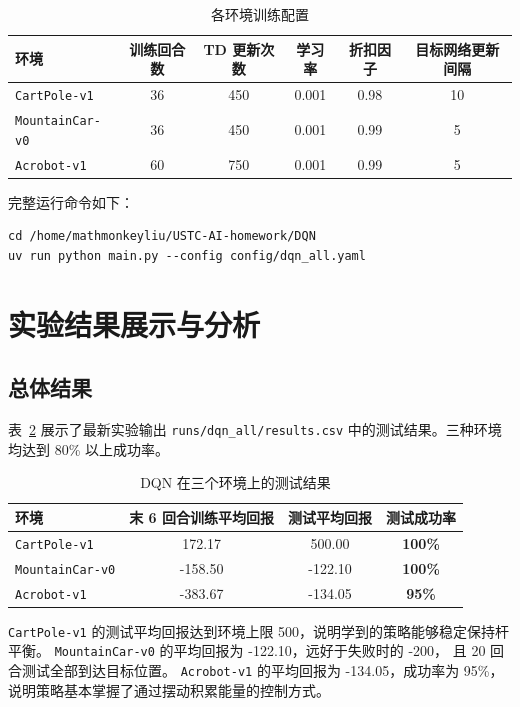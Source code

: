 \documentclass[UTF8,a4paper,12pt]{ctexart}
\begin{document}
\begin{table}[H]
\centering
\caption{各环境训练配置}
\label{tab:env_config}
\begin{tabular}{lccccc}
\toprule
环境 & 训练回合数 & TD 更新次数 & 学习率 & 折扣因子 & 目标网络更新间隔 \\
\midrule
\texttt{CartPole-v1} & 36 & 450 & 0.001 & 0.98 & 10 \\
\texttt{MountainCar-v0} & 36 & 450 & 0.001 & 0.99 & 5 \\
\texttt{Acrobot-v1} & 60 & 750 & 0.001 & 0.99 & 5 \\
\bottomrule
\end{tabular}
\end{table}

完整运行命令如下：
\begin{verbatim}
cd /home/mathmonkeyliu/USTC-AI-homework/DQN
uv run python main.py --config config/dqn_all.yaml
\end{verbatim}

\section{实验结果展示与分析}

\subsection{总体结果}

表~\ref{tab:results} 展示了最新实验输出 \texttt{runs/dqn\_all/results.csv}
中的测试结果。三种环境均达到 80\% 以上成功率。

\begin{table}[H]
\centering
\caption{DQN 在三个环境上的测试结果}
\label{tab:results}
\begin{tabular}{lccc}
\toprule
环境 & 末 6 回合训练平均回报 & 测试平均回报 & 测试成功率 \\
\midrule
\texttt{CartPole-v1} & 172.17 & 500.00 & \textbf{100\%} \\
\texttt{MountainCar-v0} & -158.50 & -122.10 & \textbf{100\%} \\
\texttt{Acrobot-v1} & -383.67 & -134.05 & \textbf{95\%} \\
\bottomrule
\end{tabular}
\end{table}

\texttt{CartPole-v1} 的测试平均回报达到环境上限 500，说明学到的策略能够稳定保持杆平衡。
\texttt{MountainCar-v0} 的平均回报为 -122.10，远好于失败时的 -200，
且 20 回合测试全部到达目标位置。
\texttt{Acrobot-v1} 的平均回报为 -134.05，成功率为 95\%，说明策略基本掌握了通过摆动积累能量的控制方式。
\end{document}
